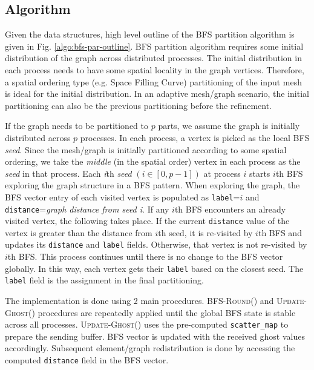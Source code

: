 \documentclass[conference]{IEEEtran}
\begin{document}
\subsection{Algorithm}
Given the data structures, high level outline of the BFS partition algorithm is given in Fig. \ref{algo:bfs-par-outline}. BFS partition algorithm requires some initial distribution of the graph across distributed processes. The initial distribution in each process needs to have some spatial locality in the graph vertices. Therefore, a spatial ordering type (e.g. Space Filling Curve) partitioning of the input mesh is ideal for the initial distribution. In an adaptive mesh/graph scenario, the initial partitioning can also be the previous partitioning before the refinement. 
\par
If the graph needs to be partitioned to $p$ parts, we assume the graph is initially distributed across $p$ processes. In each process, a vertex is picked as the local BFS \emph{seed}. Since the mesh/graph is initially partitioned according to some spatial ordering, we take the \emph{middle} (in the spatial order) vertex in each process as the \emph{seed} in that process. Each \emph{i}th \emph{seed} $(i \in [0, p-1])$ at process $i$ starts $i$th BFS exploring the graph structure in a BFS pattern. When exploring the graph, the BFS vector entry of each visited vertex is populated as \verb|label|=$i$ and \verb|distance|=\emph{graph distance from seed i}. If any $i$th BFS encounters an already visited vertex, the following takes place. If the current \verb|distance| value of the vertex is greater than the distance from $i$th seed, it is re-visited by $i$th BFS and updates its \verb|distance| and \verb|label| fields. Otherwise, that vertex is not re-visited by $i$th BFS. This process continues until there is no change to the BFS vector globally. In this way, each vertex gets their \verb|label| based on the closest seed. The \verb|label| field is the assignment in the final partitioning.
\par
The implementation is done using 2 main procedures. \textsc{BFS-Round()} and \textsc{Update-Ghost()} procedures are repeatedly applied until the global BFS state is stable across all processes. \textsc{Update-Ghost()} uses the pre-computed \verb|scatter_map| to prepare the sending buffer. BFS vector is updated with the received ghost values accordingly. Subsequent element/graph redistribution is done by accessing the computed \verb|distance| field in the BFS vector.
\end{document}
